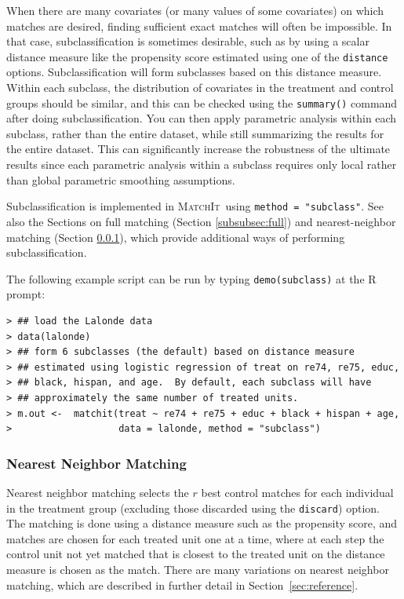 \documentclass[oneside,letterpaper,titlepage]{article}
\newcommand{\MatchIt}{\textsc{MatchIt}}
\begin{document}
When there are many covariates (or many values of some covariates) on
which matches are desired, finding sufficient exact matches will often
be impossible.  In that case, subclassification is sometimes
desirable, such as by using a scalar distance measure like the
propensity score estimated using one of the \texttt{distance} options.
Subclassification will form subclasses based on this distance measure.
Within each subclass, the distribution of covariates in the treatment
and control groups should be similar, and this can be checked using
the \texttt{summary()} command after doing subclassification.  You can
then apply parametric analysis within each subclass, rather than the
entire dataset, while still summarizing the results for the entire
dataset.  This can significantly increase the robustness of the
ultimate results since each parametric analysis within a subclass
requires only local rather than global parametric smoothing
assumptions.

Subclassification is implemented in \MatchIt\ using \texttt{method =
  "subclass"}.  See also the Sections on full matching (Section
\ref{subsubsec:full}) and nearest-neighbor matching (Section
\ref{subsubsec:nearest}), which provide additional ways of performing
subclassification.

The following example script can be run by typing {\tt demo(subclass)}
at the R prompt: 
\begin{verbatim}
> ## load the Lalonde data
> data(lalonde)
> ## form 6 subclasses (the default) based on distance measure
> ## estimated using logistic regression of treat on re74, re75, educ,
> ## black, hispan, and age.  By default, each subclass will have
> ## approximately the same number of treated units. 
> m.out <-  matchit(treat ~ re74 + re75 + educ + black + hispan + age,
>                   data = lalonde, method = "subclass")
\end{verbatim}

\subsubsection{Nearest Neighbor Matching}
\label{subsubsec:nearest}

Nearest neighbor matching selects the $r$ best control matches for
each individual in the treatment group (excluding those discarded
using the \texttt{discard}) option.  The matching is done using a
distance measure such as the propensity score, and matches are chosen
for each treated unit one at a time, where at each step the control
unit not yet matched that is closest to the treated unit on the
distance measure is chosen as the match.  There are many variations on
nearest neighbor matching, which are described in further detail in
Section~\ref{sec:reference}.
\end{document}
